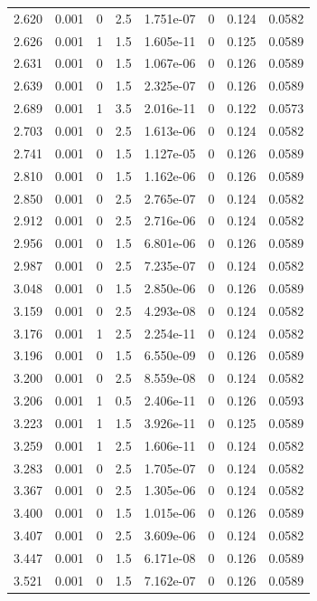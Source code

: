 \documentclass[preview]{standalone}
\begin{document}
{{{\begin{tabular}{L{1.2cm}C{1.2cm} C{0.3cm}C{0.5cm} C{1.4cm}C{1.4cm} C{1.4cm}C{1.4cm}}
  2.620  &  0.001  & 0     & 2.5 &  1.751e-07  & 0  & 0.124 &  0.0582   \\ 
  2.626  &  0.001  & 1     & 1.5 &  1.605e-11  & 0  & 0.125 &  0.0589   \\ 
  2.631  &  0.001  & 0     & 1.5 &  1.067e-06  & 0  & 0.126 &  0.0589   \\ 
  2.639  &  0.001  & 0     & 1.5 &  2.325e-07  & 0  & 0.126 &  0.0589   \\ 
  2.689  &  0.001  & 1     & 3.5 &  2.016e-11  & 0  & 0.122 &  0.0573   \\ 
  2.703  &  0.001  & 0     & 2.5 &  1.613e-06  & 0  & 0.124 &  0.0582   \\ 
  2.741  &  0.001  & 0     & 1.5 &  1.127e-05  & 0  & 0.126 &  0.0589   \\ 
  2.810  &  0.001  & 0     & 1.5 &  1.162e-06  & 0  & 0.126 &  0.0589   \\ 
  2.850  &  0.001  & 0     & 2.5 &  2.765e-07  & 0  & 0.124 &  0.0582   \\ 
  2.912  &  0.001  & 0     & 2.5 &  2.716e-06  & 0  & 0.124 &  0.0582   \\ 
  2.956  &  0.001  & 0     & 1.5 &  6.801e-06  & 0  & 0.126 &  0.0589   \\ 
  2.987  &  0.001  & 0     & 2.5 &  7.235e-07  & 0  & 0.124 &  0.0582   \\ 
  3.048  &  0.001  & 0     & 1.5 &  2.850e-06  & 0  & 0.126 &  0.0589   \\ 
  3.159  &  0.001  & 0     & 2.5 &  4.293e-08  & 0  & 0.124 &  0.0582   \\ 
  3.176  &  0.001  & 1     & 2.5 &  2.254e-11  & 0  & 0.124 &  0.0582   \\ 
  3.196  &  0.001  & 0     & 1.5 &  6.550e-09  & 0  & 0.126 &  0.0589   \\ 
  3.200  &  0.001  & 0     & 2.5 &  8.559e-08  & 0  & 0.124 &  0.0582   \\ 
  3.206  &  0.001  & 1     & 0.5 &  2.406e-11  & 0  & 0.126 &  0.0593   \\ 
  3.223  &  0.001  & 1     & 1.5 &  3.926e-11  & 0  & 0.125 &  0.0589   \\ 
  3.259  &  0.001  & 1     & 2.5 &  1.606e-11  & 0  & 0.124 &  0.0582   \\ 
  3.283  &  0.001  & 0     & 2.5 &  1.705e-07  & 0  & 0.124 &  0.0582   \\ 
  3.367  &  0.001  & 0     & 2.5 &  1.305e-06  & 0  & 0.124 &  0.0582   \\ 
  3.400  &  0.001  & 0     & 1.5 &  1.015e-06  & 0  & 0.126 &  0.0589   \\ 
  3.407  &  0.001  & 0     & 2.5 &  3.609e-06  & 0  & 0.124 &  0.0582   \\ 
  3.447  &  0.001  & 0     & 1.5 &  6.171e-08  & 0  & 0.126 &  0.0589   \\ 
  3.521  &  0.001  & 0     & 1.5 &  7.162e-07  & 0  & 0.126 &  0.0589   \\ 
\hline 
\end{tabular} 

}}}
\end{document}
